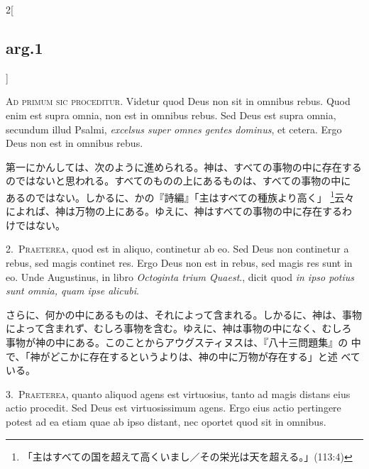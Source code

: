 \documentclass[paper=a4paper,fontsize=10pt,jafontsize=9pt,titlepage]{jlreq}
\begin{document}
\begin{paracol}{2}[\subsection{arg.1}]

{\huge A}{\scshape d primum sic proceditur}. Videtur quod Deus non sit in omnibus
 rebus. Quod enim est supra omnia, non est in omnibus rebus. Sed Deus
 est supra omnia, secundum illud Psalmi, {\itshape excelsus super omnes gentes
 dominus}, et cetera. Ergo Deus non est in omnibus rebus.

\switchcolumn

第一にかんしては、次のように進められる。神は、すべての事物の中に存在する
 のではないと思われる。すべてのものの上にあるものは、すべての事物の中に
 あるのではない。しかるに、かの『詩編』「主はすべての種族より高く」
 \footnote{「主はすべての国を超えて高くいまし／その栄光は天を超える。」(113:4)}云々
 によれば、神は万物の上にある。ゆえに、神はすべての事物の中に存在するわ
 けではない。


2.~{\scshape Praeterea}, quod est in aliquo, continetur ab eo. Sed Deus non
 continetur a rebus, sed magis continet res. Ergo Deus non est in rebus,
 sed magis res sunt in eo. Unde Augustinus, in libro {\itshape Octoginta trium
 Quaest}., dicit quod {\itshape in ipso potius sunt omnia, quam ipse alicubi}.

\switchcolumn

さらに、何かの中にあるものは、それによって含まれる。しかるに、神は、事物
 によって含まれず、むしろ事物を含む。ゆえに、神は事物の中になく、むしろ
 事物が神の中にある。このことからアウグスティヌスは、『八十三問題集』の
 中で、「神がどこかに存在するというよりは、神の中に万物が存在する」と述
 べている。


3.~{\scshape Praeterea}, quanto aliquod agens est virtuosius, tanto ad magis
 distans eius actio procedit. Sed Deus est virtuosissimum agens. Ergo
 eius actio pertingere potest ad ea etiam quae ab ipso distant, nec
 oportet quod sit in omnibus.

\switchcolumn


\end{paracol}
\end{document}
